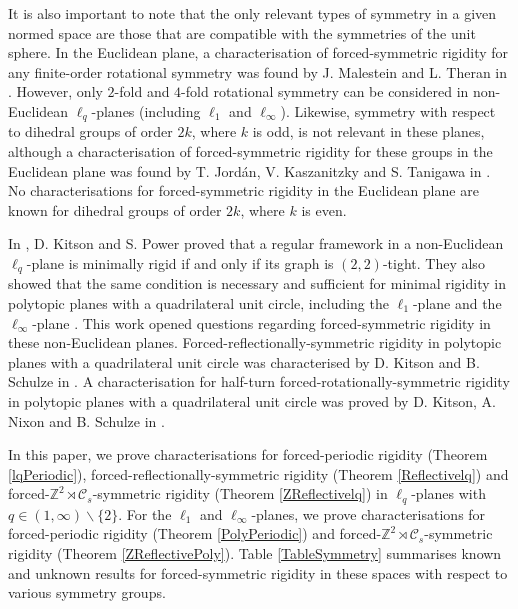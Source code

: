 \documentclass[reqno,a4paper,10pt]{article}
\theoremstyle{definition}
\theoremstyle{remark}
\numberwithin{equation}{section}
\numberwithin{figure}{section}
\numberwithin{table}{section}
\newcommand{\Z}{\mathbb{Z}}
\begin{document}
    It is also important to note that the only relevant types of symmetry in a given normed space are those that are compatible with the symmetries of the unit sphere. In the Euclidean plane, a characterisation of forced-symmetric rigidity for any finite-order rotational symmetry was found by J. Malestein and L. Theran in \cite[Theorem 1]{MalesteinSymmetry}. However, only $2$-fold and $4$-fold rotational symmetry can be considered in non-Euclidean $\ell_q$-planes (including $\ell_1$ and $\ell_\infty$). Likewise, symmetry with respect to dihedral groups of order $2k$, where $k$ is odd, is not relevant in these planes, although a characterisation of forced-symmetric rigidity for these groups in the Euclidean plane was found by T. Jord\'{a}n, V. Kaszanitzky and S. Tanigawa in \cite[Theorem 8.2]{EGRES}. No characterisations for forced-symmetric rigidity in the Euclidean plane are known for dihedral groups of order $2k$, where $k$ is even.
    
    In \cite[Theorem 3.6]{NonEuclidean}, D. Kitson and S. Power proved that a regular framework in a non-Euclidean $\ell_q$-plane is minimally rigid if and only if its graph is $(2,2)$-tight. They also showed that the same condition is necessary and sufficient for minimal rigidity in polytopic planes with a quadrilateral unit circle, including the $\ell_1$-plane and the $\ell_\infty$-plane \cite[Theorem 4.10]{NonEuclidean}. This work opened questions regarding forced-symmetric rigidity in these non-Euclidean planes. Forced-reflectionally-symmetric rigidity in polytopic planes with a quadrilateral unit circle was characterised by D. Kitson and B. Schulze in \cite[Theorem 22]{GridLike}. A characterisation for half-turn forced-rotationally-symmetric rigidity in polytopic planes with a quadrilateral unit circle was proved by D. Kitson, A. Nixon and B. Schulze in \cite[Theorem 4.3]{KitsonSymmetricNormed}.

    

    

In this paper,  we prove characterisations for forced-periodic rigidity (Theorem \ref{lqPeriodic}), forced-reflectionally-symmetric rigidity (Theorem \ref{Reflectivelq}) and forced-$\Z^2\rtimes\mathcal{C}_s$-symmetric rigidity (Theorem \ref{ZReflectivelq}) in $\ell_q$-planes with $q\in(1,\infty)\backslash\{2\}$. For the $\ell_1$ and $\ell_\infty$-planes, we prove characterisations for forced-periodic rigidity (Theorem \ref{PolyPeriodic}) and forced-$\Z^2\rtimes\mathcal{C}_s$-symmetric rigidity (Theorem \ref{ZReflectivePoly}). Table \ref{TableSymmetry} summarises known and unknown results for forced-symmetric rigidity in these spaces with respect to various symmetry groups.
\end{document}
